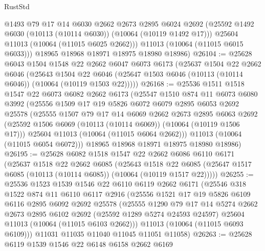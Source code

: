 \begin{lexlean}{RustStd}
\begin{coremodule}
          @1493
          @79
          @17
          @14
          @6030
          @2662
          @2673
          @2895
          @6024
          @2692
          (@25592 @1492 @6030 (@10113 (@10114 @6030)) (@10064 (@10119 @1492 @17)))
          @25604
          @11013
          (@10064 (@11015 @6025 @2662)))
        @11013
        (@10064 (@11015 @6015 @6033)))
      @18965
      @18968
      @18971
      @18975
      @18980
      @18986)
@26104 := @25628
    @6043
    @1504
    @1548
    @22
    @2662
    @6047
    @6073
    @6173
    (@25637
      @1504
      @22
      @2662
      @6046
      (@25643
        @1504
        @22
        @6046
        (@25647 @1503 @6046 (@10113 (@10114 @6046)) (@10064 (@10119 @1503 @22)))))
@26168 := @25536
    @1511
    @1518
    @1547
    @22
    @6073
    @6082
    @2662
    @6173
    (@25547
      @1510
      @874
      @11
      @6073
      @6080
      @3992
      (@25556
        @1509
        @17
        @19
        @5826
        @6072
        @6079
        @2895
        @6053
        @2692
        @25578
        (@25555
          @1507
          @79
          @17
          @14
          @6069
          @2662
          @2673
          @2895
          @6063
          @2692
          (@25592 @1506 @6069 (@10113 (@10114 @6069)) (@10064 (@10119 @1506 @17)))
          @25604
          @11013
          (@10064 (@11015 @6064 @2662)))
        @11013
        (@10064 (@11015 @6054 @6072)))
      @18965
      @18968
      @18971
      @18975
      @18980
      @18986)
@26195 := @25628
    @6082
    @1518
    @1547
    @22
    @2662
    @6086
    @6110
    @6171
    (@25637
      @1518
      @22
      @2662
      @6085
      (@25643
        @1518
        @22
        @6085
        (@25647 @1517 @6085 (@10113 (@10114 @6085)) (@10064 (@10119 @1517 @22)))))
@26255 := @25536
    @1523
    @1539
    @1546
    @22
    @6110
    @6119
    @2662
    @6171
    (@25546
      @318
      @1522
      @874
      @11
      @6110
      @6117
      @2916
      (@25556
        @1521
        @17
        @19
        @5826
        @6109
        @6116
        @2895
        @6092
        @2692
        @25578
        (@25555
          @1290
          @79
          @17
          @14
          @5274
          @2662
          @2673
          @2895
          @6102
          @2692
          (@25592 @1289 @5274 @24593 @24597)
          @25604
          @11013
          (@10064 (@11015 @6103 @2662)))
        @11013
        (@10064 (@11015 @6093 @6109)))
      @11031
      @11035
      @11040
      @11045
      @11051
      @11058)
@26263 := @25628 @6119 @1539 @1546 @22 @6148 @6158 @2662 @6169

\end{coremodule}
\end{lexlean}
